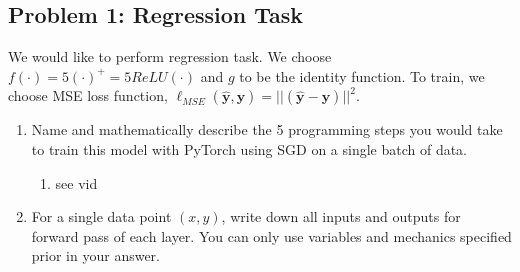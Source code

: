 \documentclass{article}
\begin{document}
\subsection*{Problem 1: Regression Task}
We would like to perform regression task. We choose
$f(\cdot)=5(\cdot)^{+}=5ReLU(\cdot)$ and $g$ to be the identity function. To
train, we choose MSE loss function,
$\ell_{MSE}(\bm{\hat{y}},\bm{y})=||(\bm{\hat{y}}-\bm{y})||^2$.
\begin{enumerate}
  \item Name and mathematically describe the 5 programming steps you
        would take to train this model with PyTorch using SGD on a single batch
        of data.
        \begin{tcolorbox}
          \begin{enumerate}
            \item see vid 
          \end{enumerate}
        \end{tcolorbox}
  \item For a single data point $(x,y)$, write down all inputs and outputs for
        forward pass of each layer. You can only use variables and mechanics specified
        prior in your answer.
\end{enumerate}
\end{document}

